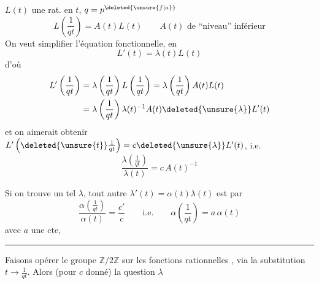 $L(t)$ une  rat. en $t$,  $q=p^{\deleted{\unsure{f|a}}}$
\[
L\left(\frac{1}{qt}\right)=A(t)L(t) \qquad A(t)\text{ de ``niveau'' inférieur}
\]
On veut simplifier l'équation fonctionnelle, en 
\[
L'(t)=\lambda(t)L(t)
\]
d'où
\[
\begin{aligned}
L'\left(\frac{1}{qt}\right)&=\lambda\left(\frac{1}{qt}\right)L\left(\frac{1}{qt}\right)=\lambda\left(\frac{1}{qt}\right)A(t)L(t)\\
&=\lambda\left(\frac{1}{qt}\right)\lambda(t)^{-1}A(t)\deleted{\unsure{\lambda}}L'(t)
\end{aligned}
\]
et on aimerait obtenir $L'\left(\deleted{\unsure{t}}\frac{1}{qt}\right)=c\deleted{\unsure{\lambda}}L'(t)$, i.e.
\[
\frac{\lambda\left(\frac{1}{qt}\right)}{\lambda(t)}=c\,A(t)^{-1}
\]

Si on trouve un tel $\lambda$, tout autre $\lambda'(t)=\alpha(t)\lambda(t)$  est  par \unsure{$\alpha$} 
\[
\frac{\alpha\left(\frac{1}{qt}\right)}{\alpha(t)}=\frac{c'}{c}\qquad \text{i.e.}\qquad \alpha\left(\frac{1}{qt}\right)=a\,\alpha(t)
\]
avec $a$ une $\mathrm{cte}$, 
\par\noindent\rule{.72\linewidth}{.3pt}

Faisons opérer le groupe  $\mathbb{Z}/2\mathbb{Z}$ sur les  fonctions rationnelles , via la substitution $t\longrightarrow\frac{1}{qt}$. Alors (pour $c$ donné) la question   $\lambda$
